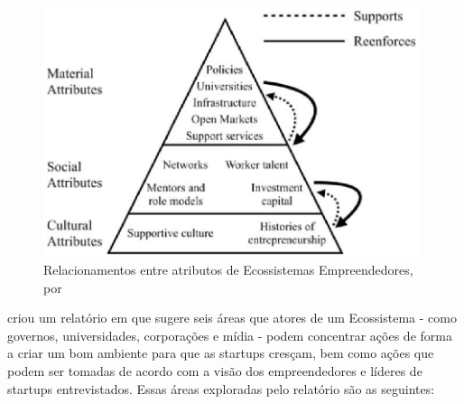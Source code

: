 \begin{figure}[!htb]
\centering
\includegraphics[width=11cm,angle=0]{figuras/relationship_among_ecosystems_attributes}
\caption{Relacionamentos entre atributos de Ecossistemas Empreendedores, por }
\label{figure:relationship_among_ecosystems_attributes}
\end{figure}

 criou um relatório em que sugere seis áreas que atores de um Ecossistema - como governos, universidades, corporações e mídia - podem concentrar ações de forma a criar um bom ambiente para que as startups cresçam, bem como ações que podem ser tomadas de acordo com a visão dos empreendedores e líderes de startups entrevistados. Essas áreas exploradas pelo relatório são as seguintes:

